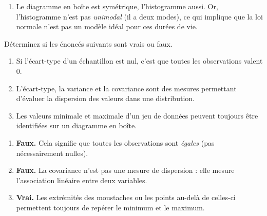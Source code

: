 \begin{exercice}
\begin{solution}
\begin{enumerate}[label=(\alph*)]
\begin{center}
  \end{center}
  \item Le diagramme en boîte est symétrique, l'histogramme aussi. Or, l'histogramme n'est
  pas \emph{unimodal} (il a deux modes), ce qui implique que la loi normale n'est pas un
  modèle idéal pour ces durées de vie.
\end{enumerate}
\end{solution}
\end{exercice}

\begin{exercice}
Déterminez si les énoncés suivants sont vrais ou faux.
\begin{enumerate}[label=(\alph*)]
  \item Si l'écart-type d'un échantillon est nul, c'est que toutes les observations valent 0.
  \item L'écart-type, la variance et la covariance sont des mesures permettant d'évaluer la
  dispersion des valeurs dans une distribution.
  \item Les valeurs minimale et maximale d'un jeu de données peuvent toujours être
  identifiées sur un diagramme en boîte.
\end{enumerate}
\begin{solution}
\begin{enumerate}[label=(\alph*)]
  \item \textbf{Faux.} Cela signifie que toutes les observations sont \emph{égales} (pas
  nécessairement nulles).
  \item \textbf{Faux.} La covariance n'est pas une mesure de dispersion : elle mesure
  l'association linéaire entre deux variables.
  \item \textbf{Vrai.} Les extrémités des moustaches ou les points au-delà de celles-ci
  permettent toujours de repérer le minimum et le maximum.
\end{enumerate}
\end{solution}
\end{exercice}

